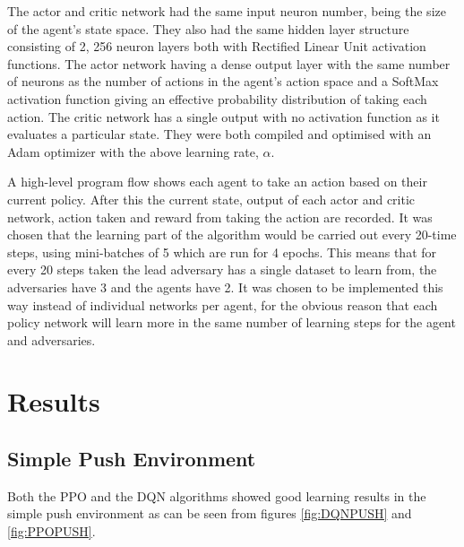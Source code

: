 \documentclass{article}
\begin{document}
The actor and critic network had the same input neuron number, being the size of the agent's state space.
They also had the same hidden layer structure consisting of 2, 256 neuron layers both with Rectified Linear Unit activation functions.
The actor network having a dense output layer with the same number of neurons as the number of actions in the agent's action space and a SoftMax activation function giving an effective probability distribution of taking each action.
The critic network has a single output with no activation function as it evaluates a particular state. They were both compiled and optimised with an Adam optimizer \citet{adam-optimiser} with the above learning rate, $\alpha$.

A high-level program flow shows each agent to take an action based on their current policy.
After this the current state, output of each actor and critic network, action taken and reward from taking the action are recorded.
It was chosen that the learning part of the algorithm would be carried out every 20-time steps, using mini-batches of 5 which are run for 4 epochs.
This means that for every 20 steps taken the lead adversary has a single dataset to learn from, the adversaries have 3 and the agents have 2.
It was chosen to be implemented this way instead of individual networks per agent, for the obvious reason that each policy network will learn more in the same number of learning steps for the agent and adversaries.

\section{Results} \label{Results}

\subsection{Simple Push Environment}

Both the PPO and the DQN algorithms showed good learning results in the simple push environment as can be seen from figures \ref{fig:DQNPUSH} and \ref{fig:PPOPUSH}.
\end{document}
